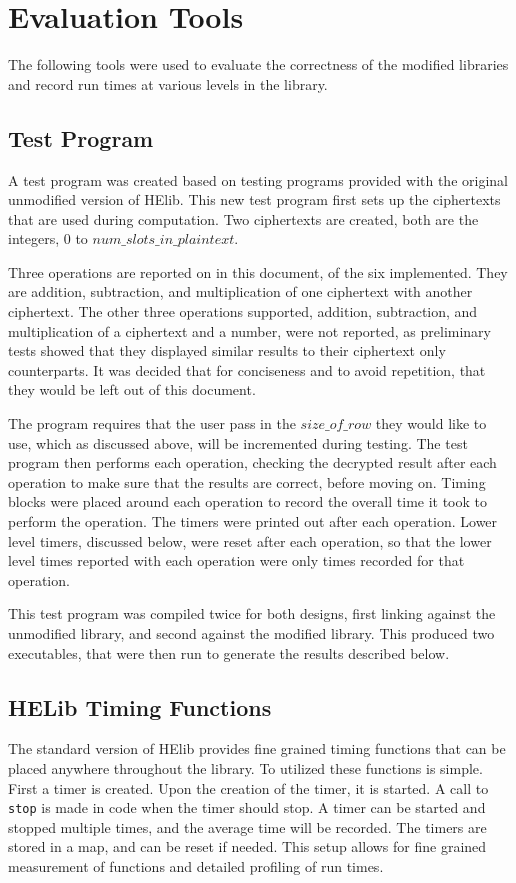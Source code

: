 \section{Evaluation Tools} \label{sec:EvaluationTools}
The following tools were used to evaluate the correctness of the modified libraries and record run times at various levels in the library.

\subsection{Test Program}
A test program was created based on testing programs provided with the original unmodified version of HElib. This new test program first sets up the ciphertexts that are used during computation. Two ciphertexts are created, both are the integers, $0$ to $ num\_slots\_in\_plaintext$. 

Three operations are reported on in this document, of the six implemented. They are addition, subtraction, and multiplication of one ciphertext with another ciphertext. The other three operations supported, addition, subtraction, and multiplication of a ciphertext and a number, were not reported, as preliminary tests showed that they displayed similar results to their ciphertext only counterparts. It was decided that for conciseness and to avoid repetition, that they would be left out of this document.

The program requires that the user pass in the $size\_of\_row$ they would like to use, which as discussed above, will be incremented during testing. The test program then performs each operation, checking the decrypted result after each operation to make sure that the results are correct, before moving on. Timing blocks were placed around each operation to record the overall time it took to perform the operation. The timers were printed out after each operation. Lower level timers, discussed below, were reset after each operation, so that the lower level times reported with each operation were only times recorded for that operation.

This test program was compiled twice for both designs, first linking against the unmodified library, and second against the modified library. This produced two executables, that were then run to generate the results described below.

\subsection{HELib Timing Functions}
The standard version of HElib provides fine grained timing functions that can be placed anywhere throughout the library. To utilized these functions is simple. First a timer is created. Upon the creation of the timer, it is started. A call to \verb|stop| is made in code when the timer should stop. A timer can be started and stopped multiple times, and the average time will be recorded. The timers are stored in a map, and can be reset if needed. This setup allows for fine grained measurement of functions and detailed profiling of run times. 

